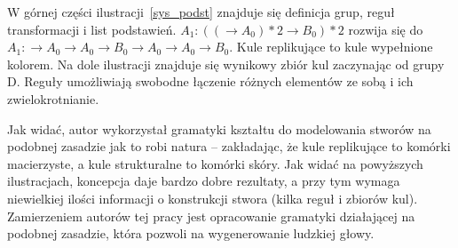 W górnej części ilustracji~\ref{sys_podst} znajduje się definicja grup, reguł
transformacji i list podstawień. $A_1:((\longrightarrow A_0)*2\longrightarrow B_0)*2$ rozwija się do
$A_1:\longrightarrow A_0\longrightarrow A_0\longrightarrow
B_0\longrightarrow A_0\longrightarrow A_0\longrightarrow B_0$. Kule replikujące
to kule wypełnione kolorem. Na dole ilustracji znajduje się wynikowy zbiór kul
zaczynając od grupy D. Reguły umożliwiają swobodne łączenie różnych elementów ze
sobą i ich zwielokrotnianie.

Jak widać, autor wykorzystał gramatyki kształtu do modelowania stworów na
podobnej zasadzie jak to robi natura -- zakładając, że kule replikujące to
komórki macierzyste, a kule strukturalne to komórki skóry. Jak widać na
powyższych ilustracjach, koncepcja daje bardzo dobre rezultaty, a przy tym
wymaga niewielkiej ilości informacji o konstrukcji stwora (kilka reguł i zbiorów
kul). Zamierzeniem autorów tej pracy jest opracowanie gramatyki działającej na
podobnej zasadzie, która pozwoli na wygenerowanie ludzkiej głowy.
